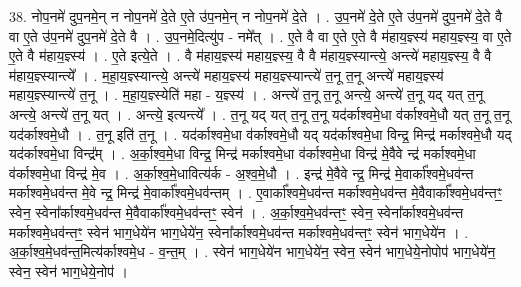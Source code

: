 \documentclass[17pt]{extarticle}
\begin{document}
38. नोप॒नमे॑ दुप॒नमे॒न् न नोप॒नमे॑ दे॒ते ए॒ते उ॑प॒नमे॒न् न नोप॒नमे॑ दे॒ते । . उ॒प॒नमे॑ दे॒ते ए॒ते उ॑प॒नमे॑ दुप॒नमे॑ दे॒ते वै वा ए॒ते उ॑प॒नमे॑ दुप॒नमे॑ दे॒ते वै । . उ॒प॒नमे॒दित्यु॑प - नमे᳚त् । . ए॒ते वै वा ए॒ते ए॒ते वै म॑हाय॒ज्ञ्स्य॑ महाय॒ज्ञ्स्य॒ वा ए॒ते ए॒ते वै म॑हाय॒ज्ञ्स्य॑ । . ए॒ते इत्ये॒ते । . वै म॑हाय॒ज्ञ्स्य॑ महाय॒ज्ञ्स्य॒ वै वै म॑हाय॒ज्ञ्स्यान्त्ये॒ अन्त्ये॑ महाय॒ज्ञ्स्य॒ वै वै म॑हाय॒ज्ञ्स्यान्त्ये᳚ । . म॒हा॒य॒ज्ञ्स्यान्त्ये॒ अन्त्ये॑ महाय॒ज्ञ्स्य॑ महाय॒ज्ञ्स्यान्त्ये॑ त॒नू त॒नू अन्त्ये॑ महाय॒ज्ञ्स्य॑ महाय॒ज्ञ्स्यान्त्ये॑ त॒नू । . म॒हा॒य॒ज्ञ्स्येति॑ महा - य॒ज्ञ्स्य॑ । . अन्त्ये॑ त॒नू त॒नू अन्त्ये॒ अन्त्ये॑ त॒नू यद् यत् त॒नू अन्त्ये॒ अन्त्ये॑ त॒नू यत् । . अन्त्ये॒ इत्यन्त्ये᳚ । . त॒नू यद् यत् त॒नू त॒नू यद॑र्काश्वमे॒धा व॑र्काश्वमे॒धौ यत् त॒नू त॒नू यद॑र्काश्वमे॒धौ । . त॒नू इति॑ त॒नू । . यद॑र्काश्वमे॒धा व॑र्काश्वमे॒धौ यद् यद॑र्काश्वमे॒धा विन्द्र॒ मिन्द्र॑ मर्काश्वमे॒धौ यद् यद॑र्काश्वमे॒धा विन्द्र᳚म् । . अ॒र्का॒श्व॒मे॒धा विन्द्र॒ मिन्द्र॑ मर्काश्वमे॒धा व॑र्काश्वमे॒धा विन्द्र॑ मे॒वैवे न्द्र॑ मर्काश्वमे॒धा व॑र्काश्वमे॒धा विन्द्र॑ मे॒व । . अ॒र्का॒श्व॒मे॒धावित्य॑र्क - अ॒श्व॒मे॒धौ । . इन्द्र॑ मे॒वैवे न्द्र॒ मिन्द्र॑ मे॒वार्का᳚श्वमे॒धव॑न्त मर्काश्वमे॒धव॑न्त मे॒वे न्द्र॒ मिन्द्र॑ मे॒वार्का᳚श्वमे॒धव॑न्तम् । . ए॒वार्का᳚श्वमे॒धव॑न्त मर्काश्वमे॒धव॑न्त मे॒वैवार्का᳚श्वमे॒धव॑न्तꣳ॒॒ स्वेन॒ स्वेना᳚र्काश्वमे॒धव॑न्त मे॒वैवार्का᳚श्वमे॒धव॑न्तꣳ॒॒ स्वेन॑ । . अ॒र्का॒श्व॒मे॒धव॑न्तꣳ॒॒ स्वेन॒ स्वेना᳚र्काश्वमे॒धव॑न्त मर्काश्वमे॒धव॑न्तꣳ॒॒ स्वेन॑ भाग॒धेये॑न भाग॒धेये॑न॒ स्वेना᳚र्काश्वमे॒धव॑न्त मर्काश्वमे॒धव॑न्तꣳ॒॒ स्वेन॑ भाग॒धेये॑न । . अ॒र्का॒श्व॒मे॒धव॑न्त॒मित्य॑र्काश्वमे॒ध - व॒न्त॒म् । . स्वेन॑ भाग॒धेये॑न भाग॒धेये॑न॒ स्वेन॒ स्वेन॑ भाग॒धेये॒नोपोप॑ भाग॒धेये॑न॒ स्वेन॒ स्वेन॑ भाग॒धेये॒नोप॑ । \newline
\end{document}
